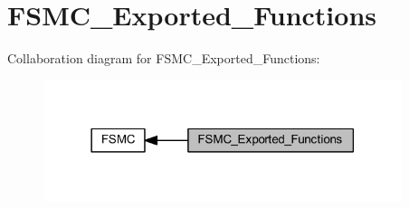 \hypertarget{group___f_s_m_c___exported___functions}{}\section{F\+S\+M\+C\+\_\+\+Exported\+\_\+\+Functions}
\label{group___f_s_m_c___exported___functions}
Collaboration diagram for F\+S\+M\+C\+\_\+\+Exported\+\_\+\+Functions\+:
\nopagebreak
\begin{figure}[H]
\begin{center}
\leavevmode
\includegraphics[width=297pt]{group___f_s_m_c___exported___functions}
\end{center}
\end{figure}
